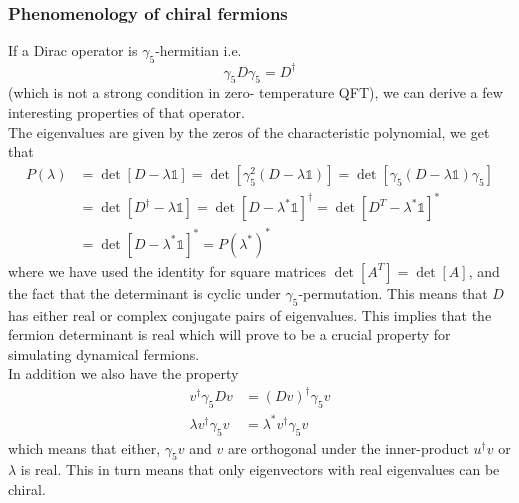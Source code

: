 \documentclass[a4paper,10pt]{article}
\begin{document}
\subsubsection{Phenomenology of chiral fermions}\label{sec:chiral_fermions_topCharge}
If a Dirac operator is $\gamma_5$-hermitian i.e.
\begin{equation}
\gamma_{5} D \gamma_{5}=D^{\dagger}
\end{equation}
(which is not a strong condition in zero- temperature QFT), we can derive a few interesting properties of that operator.\\The eigenvalues are given by the zeros of the characteristic polynomial, we get that
\begin{equation}
\begin{aligned}
P(\lambda) &=\operatorname{det}[D-\lambda \mathbb{1}]=\operatorname{det}\left[\gamma_{5}^{2}(D-\lambda \mathbb{1})\right]=\operatorname{det}\left[\gamma_{5}(D-\lambda \mathbb{1}) \gamma_{5}\right] \\
&=\operatorname{det}\left[D^{\dagger}-\lambda \mathbb{1}\right]=\operatorname{det}\left[D-\lambda^{*} \mathbb{1}\right]^{\dagger}=\operatorname{det}\left[D^T-\lambda^{*} \mathbb{1}\right]^{*}\\&=\operatorname{det}\left[D-\lambda^{*} \mathbb{1}\right]^{*}=P\left(\lambda^{*}\right)^{*}
\end{aligned}
\end{equation}
where we have used the identity for square matrices $\operatorname{det}\left[ A^T \right] = \operatorname{det}\left[ A \right]$, and the fact that the determinant is cyclic under $\gamma_5$-permutation. This means that $D$ has either real or complex conjugate pairs of eigenvalues. This implies that the fermion determinant is real which will prove to be a crucial property for simulating dynamical fermions.\\In addition we also have the property
\begin{equation}
\begin{aligned} 
v^\dagger \gamma_5Dv &= (Dv)^\dagger\gamma_5v\\\lambda v^\dagger \gamma_5v &=\lambda^*v^\dagger \gamma_5v 
\end{aligned}
\end{equation}
which means that either, $\gamma_5v $ and $v$ are orthogonal under the inner-product $u^\dagger v$ or $\lambda$ is real. This in turn means that only eigenvectors with real eigenvalues can be chiral.\\\\
\end{document}
